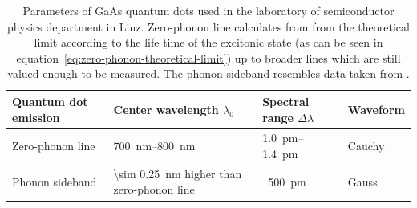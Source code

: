 \begin{table}[H]
	\caption[Paramters of GaAs quantum dots used in the laboratory of semiconductor physics department in Linz.]{Parameters of GaAs quantum dots used in the laboratory of semiconductor physics department in Linz.
		Zero-phonon line calculates from from the theoretical limit according to the life time of the excitonic state (as can be seen in equation~\eqref{eq:zero-phonon-theoretical-limit}) up to broader lines which are still valued enough to be measured.
		The phonon sideband resembles data taken from \textcite{scholl_resonance_2019}.}
	\label{tab:quantum-dot-emission}
	\begin{tabular}{@{}llll@{}}
		\toprule
		Quantum dot emission & Center wavelength $\lambda_0$           & Spectral range $\Delta \lambda$ & Waveform                  \\ \midrule
		Zero-phonon line               & \SIrange{700}{800}{\nano \metre} & \SIrange{1.0}{1.4}{\pico \metre} & Cauchy\\
		Phonon sideband       & \SI{\sim 0.25}{\nano \metre} higher than zero-phonon line  & ~\SI{500}{\pico \metre} & Gauss  \\ \bottomrule
	\end{tabular}
\end{table}

\newpage

